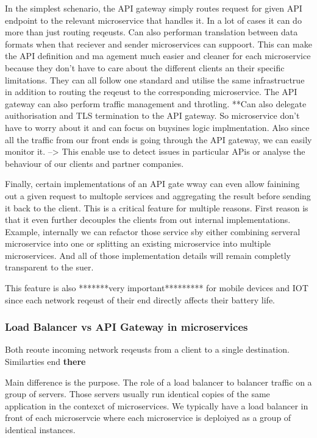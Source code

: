 \documentclass[a4paper, 11pt]{book}
\begin{document}
    In the simplest schenario, the API gateway simply routes request for given API endpoint to the relevant microservice that handles it.
    In a lot of cases it can do more than just routing reqeusts.
    Can also performan translation between data formats when that reciever and sender microservices can suppoort.
    This can make the API definition and ma agement much easier and cleaner for each microservice because they don't have to care about the different clients an their specific limitations.
    They can all follow one standard and utilise the same infrastructrue in addition to routing the reqeust to the corresponding microservice.
    The API gateway can also perform traffic management and throtling.
    **Can also delegate auithorisation and TLS termination to the API gateway.
    So microservice don't have to worry about it and can focus on buysines logic implmentation.
    Also since all the traffic from our front ends is going through the API gateway, we can easily monitor it.
    --> This enable use to detect issues in particular APis or analyse the behaviour of our clients and partner companies.

    Finally, certain implementations of an API gate wway can even allow fainining out a given request to multople services and aggregating the result before sending it back to the client.
    This is a critical feature for multiple reasons.
    First reason is that it even further decouples the clients from out internal implementations.
    Example, internally we can refactor those service sby either combining serveral microservice into one or splitting an existing microservice into multiple microservices.
    And all of those implementation details will remain completly transparent to the suer.

    This feature is also *******very important********* for mobile devices and IOT since each network reqeust of their end directly affects their battery life.

    \subsubsection{Load Balancer vs API Gateway in microservices}
    Both reoute incoming network reqeusts from a client to a single destination.
    Similarties end \textbf{there}

    Main difference is the purpose.
    The role of a load balancer to balancer traffic on a group of servers.
    Those servers usually run identical copies of the same application in the contexct of microservices.
    We typically have a load balancer in front of each microservcie where each microservice is deploiyed as a group of identical instances.
\end{document}
